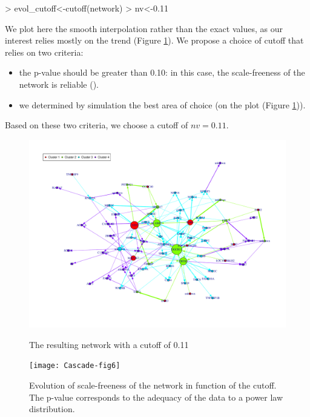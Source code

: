 \documentclass[a4paper]{article}
\begin{document}
\begin{Schunk}
\begin{Sinput}
> evol_cutoff<-cutoff(network)
> nv<-0.11
\end{Sinput}
\end{Schunk}


We plot here the smooth interpolation rather than the exact values, as our interest relies mostly on the trend (Figure \ref{eve}). We propose a choice of cutoff that relies on two criteria: 

\begin{itemize}
\item the p-value should be greater than 0.10: in this case, the scale-freeness of the network is reliable (\cite{clauset2009power}).
\item we determined by simulation the best area of choice (on the plot (Figure \ref{eve})). \\
\end{itemize}

Based on these two criteria, we choose a cutoff of $nv=0.11$. 




\begin{figure}
\centering
\includegraphics[clip=true,trim= 2.05cm 3cm 2cm 2cm]{Cascade-fig5}
\caption{The resulting network with a cutoff of 0.11}\label{net2}
\texttt{[image: Cascade-fig6]}
\caption{Evolution of scale-freeness of the network in function of the cutoff. The p-value corresponds to the adequacy of the data to a power law distribution. }\label{eve}
\end{figure}
\restoregeometry
\end{document}
